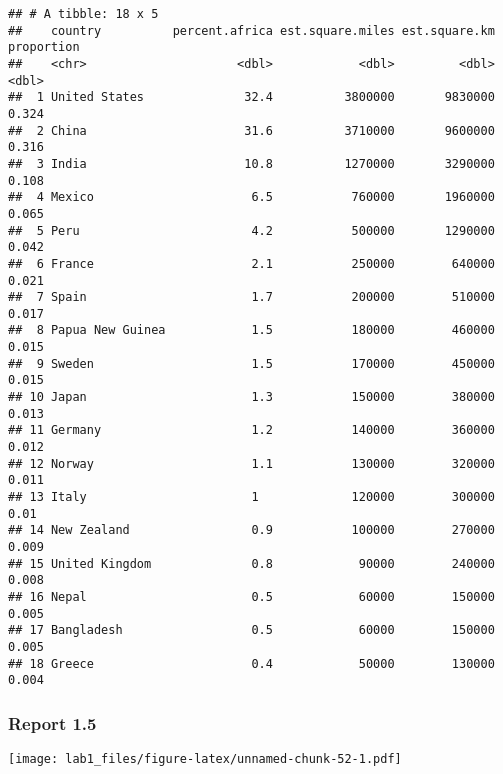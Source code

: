 \documentclass[
]{article}
\newenvironment{Shaded}{\begin{snugshade}}{\end{snugshade}}
\newcommand{\CommentTok}[1]{\textcolor[rgb]{0.56,0.35,0.01}{\textit{#1}}}
\newcommand{\FunctionTok}[1]{\textcolor[rgb]{0.13,0.29,0.53}{\textbf{#1}}}
\newcommand{\NormalTok}[1]{#1}
\newcommand{\SpecialCharTok}[1]{\textcolor[rgb]{0.81,0.36,0.00}{\textbf{#1}}}
\newcommand{\StringTok}[1]{\textcolor[rgb]{0.31,0.60,0.02}{#1}}
\begin{document}
\begin{verbatim}
## # A tibble: 18 x 5
##    country          percent.africa est.square.miles est.square.km proportion
##    <chr>                     <dbl>            <dbl>         <dbl>      <dbl>
##  1 United States              32.4          3800000       9830000      0.324
##  2 China                      31.6          3710000       9600000      0.316
##  3 India                      10.8          1270000       3290000      0.108
##  4 Mexico                      6.5           760000       1960000      0.065
##  5 Peru                        4.2           500000       1290000      0.042
##  6 France                      2.1           250000        640000      0.021
##  7 Spain                       1.7           200000        510000      0.017
##  8 Papua New Guinea            1.5           180000        460000      0.015
##  9 Sweden                      1.5           170000        450000      0.015
## 10 Japan                       1.3           150000        380000      0.013
## 11 Germany                     1.2           140000        360000      0.012
## 12 Norway                      1.1           130000        320000      0.011
## 13 Italy                       1             120000        300000      0.01 
## 14 New Zealand                 0.9           100000        270000      0.009
## 15 United Kingdom              0.8            90000        240000      0.008
## 16 Nepal                       0.5            60000        150000      0.005
## 17 Bangladesh                  0.5            60000        150000      0.005
## 18 Greece                      0.4            50000        130000      0.004
\end{verbatim}

\subsubsection{Report 1.5}\label{report-1.5}

\begin{Shaded}
\end{Shaded}

\texttt{[image: lab1\_files/figure-latex/unnamed-chunk-52-1.pdf]}
\end{document}

